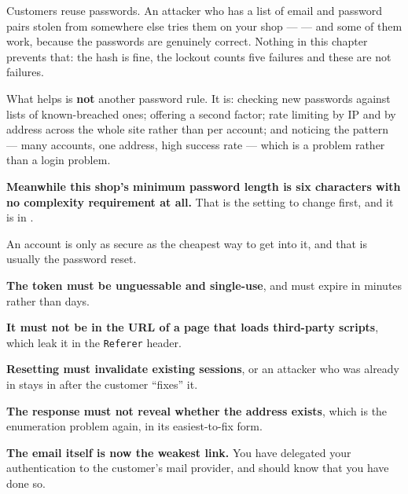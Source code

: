 \begin{alertbox}
Customers reuse passwords. An attacker who has a list of email and password
pairs stolen from somewhere else tries them on your shop ---  --- and some of them work, because the passwords are genuinely
correct. Nothing in this chapter prevents that: the hash is fine, the lockout
counts five failures and these are not failures.

\smallskip
What helps is \textbf{not} another password rule. It is: checking new passwords
against lists of known-breached ones; offering a second factor; rate limiting by
IP and by address across the whole site rather than per account; and noticing
the pattern --- many accounts, one address, high success rate --- which is a
 problem rather than a login problem.

\smallskip
\textbf{Meanwhile this shop's minimum password length is six characters with no
complexity requirement at all.} That is the setting to change first, and it is
in .
\end{alertbox}

\begin{conceptbox}
An account is only as secure as the cheapest way to get into it, and that is
usually the password reset.

\begin{tightnum}
  \item \textbf{The token must be unguessable and single-use}, and must expire
        in minutes rather than days.
  \item \textbf{It must not be in the URL of a page that loads third-party
        scripts}, which leak it in the \texttt{Referer} header.
  \item \textbf{Resetting must invalidate existing sessions}, or an attacker
        who was already in stays in after the customer ``fixes'' it.
  \item \textbf{The response must not reveal whether the address exists}, which
        is the enumeration problem again, in its easiest-to-fix form.
  \item \textbf{The email itself is now the weakest link.} You have delegated
        your authentication to the customer's mail provider, and should know
        that you have done so.
\end{tightnum}
\end{conceptbox}

